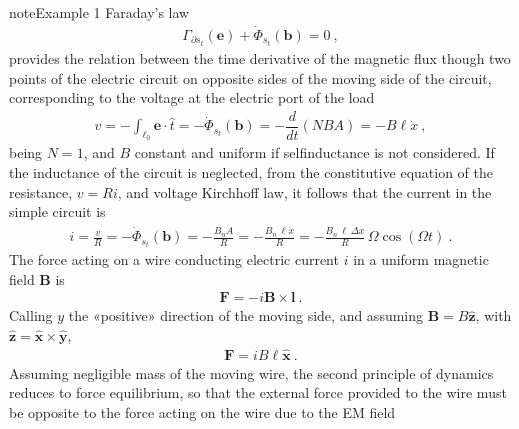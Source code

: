 \documentclass[letterpaper,10pt,italian]{jupyterBook}
\begin{document}
\begin{sphinxadmonition}{note}{Example 1}
\sphinxAtStartPar
{} Faraday’s law
\begin{equation*}
\begin{split}\Gamma_{\partial s_t}(\mathbf{e}) + \dot{\Phi}_{s_t}(\mathbf{b}) = 0 \ ,\end{split}
\end{equation*}
\sphinxAtStartPar
provides the relation between the time derivative of the magnetic flux though two points of the electric circuit on opposite sides of the moving side of the circuit, corresponding to the voltage at the electric port of the load
\begin{equation*}
\begin{split}v = - \int_{\ell_0} \mathbf{e} \cdot \hat{t} = - \dot{\Phi}_{s_t}(\mathbf{b}) = - \dfrac{d}{dt} \left( N B A \right) = - B \ell \dot{x} \ ,\end{split}
\end{equation*}
\sphinxAtStartPar
being \(N = 1\), and \(B\) constant and uniform if self\sphinxhyphen{}inductance is not considered.
If the inductance of the circuit is neglected, from the constitutive equation of the resistance, \(v = R i\), and voltage Kirchhoff law, it follows that the current in the simple circuit is
\begin{equation*}
\begin{split}i = \frac{v}{R} = - \dot{\Phi}_{s_t}(\mathbf{b}) = - \frac{B_n \dot{A}}{R} = - \frac{B_n \, \ell \dot{x}}{R} = - \frac{B_n \, \ell \, \Delta x}{R} \, \Omega \cos(\Omega t) \ .\end{split}
\end{equation*}
\sphinxAtStartPar
The force acting on a wire conducting electric current \(i\) in a uniform magnetic field \(\mathbf{B}\) is
\begin{equation*}
\begin{split}\mathbf{F} = - i \mathbf{B} \times \mathbf{l} \ .\end{split}
\end{equation*}
\sphinxAtStartPar
Calling \(y\) the «positive» direction of the moving side, and assuming \(\mathbf{B} = B \hat{\mathbf{z}}\), with \(\hat{\mathbf{z}} = \hat{\mathbf{x}} \times \hat{\mathbf{y}}\),
\begin{equation*}
\begin{split}\mathbf{F} = i B \ell \hat{\mathbf{x}} \ .\end{split}
\end{equation*}
\sphinxAtStartPar
Assuming negligible mass of the moving wire, the second principle of dynamics reduces to force equilibrium, so that the external force provided to the wire must be opposite to the force acting on the wire due to the EM field

\end{sphinxadmonition}
\end{document}
